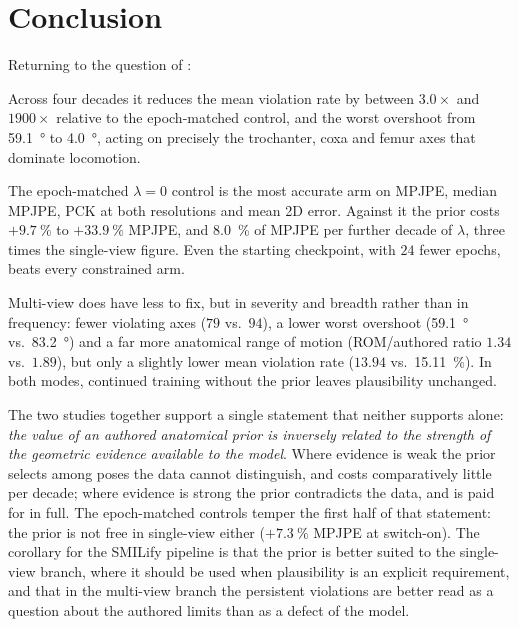 \documentclass[11pt,a4paper]{article}
\newcommand{\lam}{\lambda}
\begin{document}
\section{Conclusion}
\label{sec:conclusion}

Returning to the question of :

\begin{description}[leftmargin=1.4em,style=nextline]
\item[The prior still works on what it penalises --- yes.]
  Across four decades it reduces the mean violation rate by between $3.0\times$
  and $1900\times$ relative to the epoch-matched control, and the worst
  overshoot from \SI{59.1}{\degree} to
  \SI{4.0}{\degree}, acting on precisely the trochanter, coxa and femur axes
  that dominate locomotion.
\item[Is it worthwhile in multi-view --- on this evidence, no.]
  The epoch-matched $\lam = 0$ control is the most accurate arm on MPJPE,
  median MPJPE, PCK at both resolutions and mean 2D error. Against it the prior
  costs $+\SI{9.7}{\percent}$ to $+\SI{33.9}{\percent}$ MPJPE, and
  \SI{8.0}{\percent} of MPJPE per further decade of $\lam$, three times the
  single-view figure. Even the starting checkpoint, with $24$ fewer epochs,
  beats every constrained arm.
\item[Was the hypothesis of \cite{sv} confirmed --- partially.]
  Multi-view does have less to fix, but in severity and breadth rather than in
  frequency: fewer violating axes ($79$ vs.\ $94$), a lower worst overshoot
  (\SI{59.1}{\degree} vs.\ \SI{83.2}{\degree}) and a far more anatomical range
  of motion (ROM/authored ratio $1.34$ vs.\ $1.89$), but only a slightly lower
  mean violation rate ($13.94$ vs.\ \SI{15.11}{\percent}). In both modes,
  continued training without the prior leaves plausibility unchanged.
\end{description}

The two studies together support a single statement that neither supports
alone: \emph{the value of an authored anatomical prior is inversely related to
the strength of the geometric evidence available to the model}. Where evidence
is weak the prior selects among poses the data cannot distinguish, and costs
comparatively little per decade; where evidence is strong the prior contradicts
the data, and is paid for in full. The epoch-matched controls temper the first
half of that statement: the prior is not free in single-view either
($+\SI{7.3}{\percent}$ MPJPE at switch-on). The corollary for the SMILify
pipeline is that the prior is better suited to the single-view branch, where
it should be used when plausibility is an explicit requirement, and that in the
multi-view branch the persistent violations are better read as a question
about the authored limits than as a defect of the model.
\end{document}

